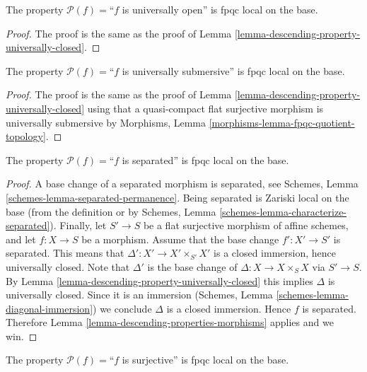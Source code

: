 \begin{lemma}
\label{lemma-descending-property-universally-open}
The property $\mathcal{P}(f) =$``$f$ is universally open''
is fpqc local on the base.
\end{lemma}

\begin{proof}
The proof is the same as the proof of
Lemma \ref{lemma-descending-property-universally-closed}.
\end{proof}

\begin{lemma}
\label{lemma-descending-property-universally-submersive}
The property $\mathcal{P}(f) =$``$f$ is universally submersive''
is fpqc local on the base.
\end{lemma}

\begin{proof}
The proof is the same as the proof of
Lemma \ref{lemma-descending-property-universally-closed}
using that a quasi-compact flat surjective morphism is
universally submersive by
Morphisms, Lemma \ref{morphisms-lemma-fpqc-quotient-topology}.
\end{proof}

\begin{lemma}
\label{lemma-descending-property-separated}
The property $\mathcal{P}(f) =$``$f$ is separated''
is fpqc local on the base.
\end{lemma}

\begin{proof}
A base change of a separated morphism is separated, see
Schemes, Lemma \ref{schemes-lemma-separated-permanence}.
Being separated is Zariski local on the base (from the
definition or by
Schemes, Lemma \ref{schemes-lemma-characterize-separated}).
Finally, let
$S' \to S$ be a flat surjective morphism of affine schemes,
and let $f : X \to S$ be a morphism. Assume that the base change
$f' : X' \to S'$ is separated. This means that
$\Delta' : X' \to X'\times_{S'} X'$ is a closed immersion,
hence universally closed.
Note that $\Delta'$ is the base change of $\Delta : X \to X \times_S X$
via $S' \to S$. By Lemma \ref{lemma-descending-property-universally-closed}
this implies $\Delta$ is universally closed. Since it is
an immersion
(Schemes, Lemma \ref{schemes-lemma-diagonal-immersion})
we conclude $\Delta$ is a closed immersion.
Hence $f$ is separated.
Therefore Lemma \ref{lemma-descending-properties-morphisms} applies and we win.
\end{proof}

\begin{lemma}
\label{lemma-descending-property-surjective}
The property $\mathcal{P}(f) =$``$f$ is surjective''
is fpqc local on the base.
\end{lemma}

